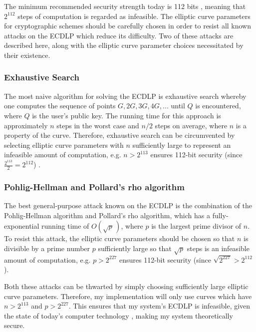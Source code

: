 \documentclass[12pt,a4paper]{article}
\begin{document}
The minimum recommended security strength today is 112 bits \cite{barker2020recommendation}, 
meaning that $2^{112}$ steps of computation is regarded as infeasible. 
The elliptic curve parameters for cryptographic schemes should be carefully chosen in order to resist all known attacks on the ECDLP which reduce its difficulty. 
Two of these attacks are described here, along with the elliptic curve parameter choices necessitated by their existence. 

\subsubsection{Exhaustive Search} \noindent \label{Exhaustive Search}
The most naive algorithm for solving the ECDLP is exhaustive search whereby one computes the sequence of points 
$G,2G,3G,4G,...$ until $Q$ is encountered, where $Q$ is the user's public key. 
The running time for this approach is approximately $n$ steps in the worst case and $n/2$ steps on average, 
where $n$ is a property of the curve. 
Therefore, exhaustive search can be circumvented by selecting elliptic curve parameters with $n$ sufficiently 
large to represent an infeasible amount of computation, e.g. $n > 2^{113}$ ensures 112-bit security (since $\frac{2^{113}}{2} = 2^{112}$) \cite{hankerson2003guide}. 

\subsubsection{Pohlig-Hellman and Pollard's rho algorithm} \noindent \label{Pohlig-Hellman and Pollard's rho algorithm}
The best general-purpose attack known on the ECDLP is the combination of the Pohlig-Hellman algorithm and Pollard's rho algorithm, 
which has a fully-exponential running time of $O( \sqrt p \,)$, where $p$ is the largest prime divisor of $n$. 
To resist this attack, the elliptic curve parameters should be chosen so that $n$ is divisible by a prime number $p$ sufficiently large 
so that $\sqrt p$ steps is an infeasible amount of computation, e.g. $p > 2^{227}$ ensures 112-bit security (since $\sqrt{2^{227}} > 2^{112}$). 

\vspace{2mm}

Both these attacks can be thwarted by simply choosing sufficiently large elliptic curve parameters. 
Therefore, my implementation will only use curves which have $n > 2^{113}$ and $p > 2^{227}$. 
This ensures that my system's ECDLP is infeasible, given the state of today's computer technology \cite{hankerson2003guide}, 
making my system theoretically secure. 
\end{document}
